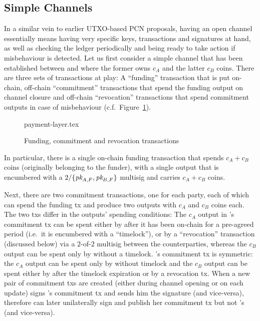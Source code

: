 \subsection{Simple Channels}
  In a similar vein to earlier UTXO-based PCN proposals, having an open channel essentially
  means having very specific keys, transactions and signatures at hand, as well
  as checking the ledger periodically and being ready to take action if
  misbehaviour is detected. Let us first consider a simple channel that has been
  established between \alice and \bob where the former owns $c_A$ and the latter
  $c_B$ coins. There are three sets of transactions at play: A ``funding''
  transaction that is put on-chain, off-chain ``commitment'' transactions that
  spend the funding output on channel closure and off-chain ``revocation''
  transactions that spend commitment outputs in case of misbehaviour (c.f.\
  Figure~\ref{figure:payment-layer}).

  \begin{figure}
    {payment-layer.tex}
    \caption{Funding, commitment and revocation transactions}
    \label{figure:payment-layer}
  \end{figure}

  In particular, there is a single on-chain funding transaction that spends $c_A
  + c_B$ coins (originally belonging to the funder), with a single output that is encumbered with a
  $2/\{\textit{pk}_{A, F}, \textit{pk}_{B, F}\}$ multisig and carries $c_A + c_B$ coins.

  Next, there are two commitment transactions, one for each party, each of which can spend the
  funding tx and produce two outputs with $c_A$ and $c_B$ coins each. The two
  txs differ in the outputs' spending conditions: The $c_A$ output in \alice's
  commitment tx can be spent either by \alice after it has been on-chain for a
  pre-agreed period (i.e.\ it is encumbered with a ``timelock''), or by a
  ``revocation'' transaction (discussed below) via a $2$-of-$2$ multisig between
  the counterparties, whereas the $c_B$ output can be spent only by \bob without
  a timelock. \bob's commitment tx is symmetric: the $c_A$ output can be spent
  only by \alice without timelock and the $c_B$ output can be spent either by
  \bob after the timelock expiration or by a revocation tx. When a new pair of
  commitment txs are created (either during channel opening or on each update)
  \alice signs \bob's commitment tx and sends him the signature (and
  vice-versa), therefore \alice can later unilaterally sign and publish her commitment
  tx but not \bob's (and vice-versa).

